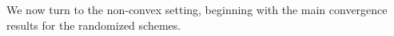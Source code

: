 \documentclass[12pt]{article}
\numberwithin{equation}{section}
\begin{document}

We now turn to the non-convex setting, beginning with the main
convergence results for the randomized schemes.
\end{document}
